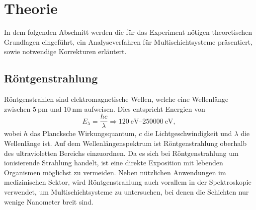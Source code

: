 \chapter{Theorie}
\label{cha:Theorie}

In dem folgenden Abschnitt werden die für das Experiment nötigen theoretischen Grundlagen eingeführt, ein Analyseverfahren für Multischichtsysteme präsentiert, sowie 
notwendige Korrekturen erläutert.

\section{Röntgenstrahlung}

Röntgenstrahlen sind elektromagnetische Wellen, welche eine Wellenlänge zwischen $\qty{5}{\pico\metre}$ und $\qty{10}{\nano\metre}$ aufweisen.
Dies entspricht Energien von
\begin{equation*}
    E_{\lambda} = \frac{hc}{\lambda} \Rightarrow \qtyrange{120}{250000}{\electronvolt},
\end{equation*}
wobei $h$ das Plancksche Wirkungsquantum, $c$ die Lichtgeschwindigkeit und $\lambda$ die Wellenlänge ist. Auf dem Wellenlängenspektrum ist Röntgenstrahlung
oberhalb des ultravioletten Bereichs einzuordnen. Da es sich bei Röntgenstrahlung um ionisierende Strahlung handelt, ist eine direkte Exposition mit lebenden
Organismen möglichst zu vermeiden. Neben nützlichen Anwendungen im medizinischen Sektor, wird Röntgenstrahlung auch vorallem in der Spektroskopie verwendet,
um Multischichtsysteme zu untersuchen, bei denen die Schichten nur wenige Nanometer breit sind.


